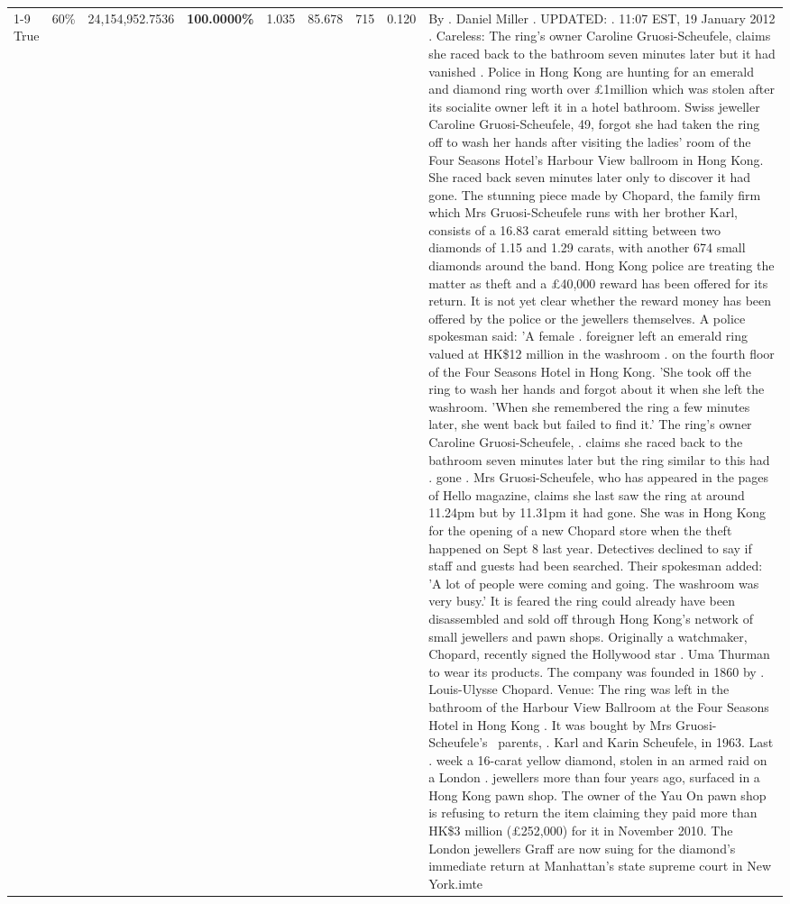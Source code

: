 \begin{table}[H]
\begin{tabular}{lllrlllll}
\cline{1-9} \cline{2-9}
True & 60\% & 24,154,952.7536 & \bfseries \color{red} 100.0000\% & 1.035 & 85.678 & 715 & 0.120 & By . Daniel Miller . UPDATED: . 11:07 EST, 19 January 2012 . Careless: The ring's owner Caroline Gruosi-Scheufele, claims she raced back to the bathroom seven minutes later but it had vanished . Police in Hong Kong are hunting for an emerald and diamond ring worth over £1million which was stolen after its socialite owner left it in a hotel bathroom. Swiss jeweller Caroline Gruosi-Scheufele, 49, forgot she had taken the ring off to wash her hands after visiting the ladies' room of the Four Seasons Hotel's Harbour View ballroom in Hong Kong. She raced back seven minutes later only to discover it had gone. The stunning piece made by Chopard, the family firm which Mrs Gruosi-Scheufele runs with her brother Karl, consists of a 16.83 carat emerald sitting between two diamonds of 1.15 and 1.29 carats, with another 674 small diamonds around the band. Hong Kong police are treating the matter as theft and a £40,000 reward has been offered for its return. It is not yet clear whether the reward money has been offered by the police or the jewellers themselves. A police spokesman said: 'A female . foreigner left an emerald ring valued at HK\$12 million in the washroom . on the fourth floor of the Four Seasons Hotel in Hong Kong. 'She took off the ring to wash her hands and forgot about it when she left the washroom. 'When she remembered the ring a few minutes later, she went back but failed to find it.' The ring's owner Caroline Gruosi-Scheufele, . claims she raced back to the bathroom seven minutes later but the ring similar to this had . gone . Mrs Gruosi-Scheufele, who has appeared in the pages of Hello magazine, claims she last saw the ring at around 11.24pm but by 11.31pm it had gone. She was in Hong Kong for the opening of a new Chopard store when the theft happened on Sept 8 last year. Detectives declined to say if staff and guests had been searched. Their spokesman added: 'A lot of people were coming and going. The washroom was very busy.' It is feared the ring could already have been disassembled and sold off through Hong Kong's network of small jewellers and pawn shops. Originally a watchmaker, Chopard, recently signed the Hollywood star . Uma Thurman to wear its products. The company was founded in 1860 by . Louis-Ulysse Chopard. Venue: The ring was left in the bathroom of the Harbour View Ballroom at the Four Seasons Hotel in Hong Kong . It was bought by Mrs Gruosi-Scheufele's  parents, . Karl and Karin Scheufele, in 1963. Last . week a 16-carat yellow diamond, stolen in an armed raid on a London . jewellers more than four years ago, surfaced in a Hong Kong pawn shop. The owner of the Yau On pawn shop is refusing to return the item claiming they paid more than HK\$3 million (£252,000) for it in November 2010. The London jewellers Graff are now suing for the diamond’s immediate return at Manhattan’s state supreme court in New York.imte \\

\end{tabular}
\end{table}
